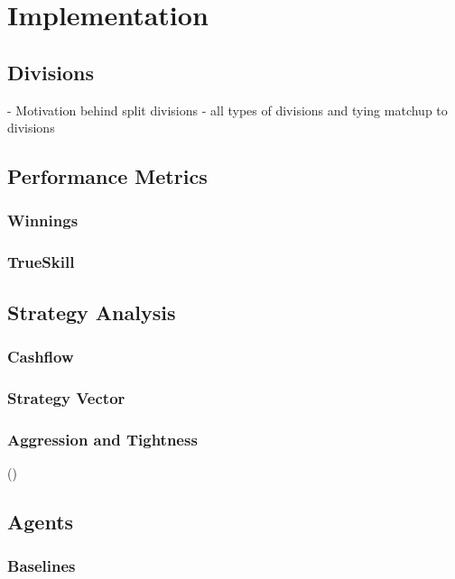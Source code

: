 \chapter{Implementation}

\section{Divisions}
- Motivation behind split divisions
- all types of divisions and tying matchup to divisions


\section{Performance Metrics}

\subsection{Winnings}

\subsection{TrueSkill}


\section{Strategy Analysis}

\subsection{Cashflow}

\subsection{Strategy Vector}

\subsection{Aggression and Tightness}
(\cite{PokerStrategy})


\section{Agents}

\subsection{Baselines}



